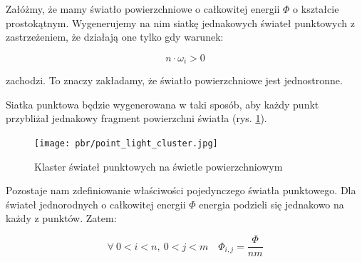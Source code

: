 \documentclass[../main.tex]{subfiles}
\begin{document}
Załóżmy, że mamy światło powierzchniowe o całkowitej energii $\Phi$ o kształcie
prostokątnym. Wygenerujemy na nim siatkę jednakowych świateł punktowych z
zastrzeżeniem, że działają one tylko gdy warunek:

\[ n \cdot \omega_i > 0 \]

\noindent zachodzi. To znaczy zakładamy, że światło powierzchniowe jest
jednostronne.

Siatka punktowa będzie wygenerowana w taki sposób, aby każdy punkt przybliżał
jednakowy fragment powierzchni światła (rys. \ref{fig:PointLightCluster}).

\begin{figure}[ht]
  \centering
  \texttt{[image: pbr/point\_light\_cluster.jpg]}
  \caption{Klaster świateł punktowych na świetle powierzchniowym}
  \label{fig:PointLightCluster}
\end{figure}

Pozostaje nam zdefiniowanie właściwości pojedynczego światła punktowego.
Dla świateł jednorodnych o całkowitej energii $\Phi$ energia podzieli się
jednakowo na każdy z punktów. Zatem:

\[
  \forall\:{
    0<i<n,\:
    0<j<m
  } \quad
  \Phi_{i,j} = \frac{\Phi}{nm}
\]
\end{document}

